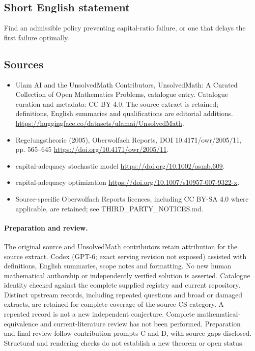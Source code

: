 \documentclass[11pt]{article}
\begin{document}
\subsection{Short English statement}
Find an admissible policy preventing capital-ratio failure, or one that delays the first failure optimally.
\subsection{Sources}
\begin{itemize}
\item[\hypertarget{source:statement:1}{S1}] Ulam AI and the UnsolvedMath Contributors, UnsolvedMath: A Curated Collection of Open Mathematics Problems, catalogue entry. Catalogue curation and metadata: CC BY 4.0. The source extract is retained; definitions, English summaries and qualifications are editorial additions.
\url{https://huggingface.co/datasets/ulamai/UnsolvedMath}.
\item[\hypertarget{source:statement:2}{S2}] Regelungstheorie (2005), Oberwolfach Reports, DOI 10.4171/owr/2005/11, pp. 565--645
\url{https://doi.org/10.4171/owr/2005/11}.
\item[\hypertarget{source:statement:3}{S3}] capital-adequacy stochastic model
\url{https://doi.org/10.1002/asmb.609}.
\item[\hypertarget{source:statement:4}{S4}] capital-adequacy optimization
\url{https://doi.org/10.1007/s10957-007-9322-x}.
\item Source-specific Oberwolfach Reports licences, including CC BY-SA 4.0 where applicable, are retained; see THIRD\_PARTY\_NOTICES.md.
\end{itemize}
\paragraph{Preparation and review.}
The original source and UnsolvedMath contributors retain attribution for the source extract. Codex (GPT-6; exact serving revision not exposed) assisted with definitions, English summaries, scope notes and formatting. No new human mathematical authorship or independently verified solution is asserted. Catalogue identity checked against the complete supplied registry and current repository. Distinct upstream records, including repeated questions and broad or damaged extracts, are retained for complete coverage of the source CS category. A repeated record is not a new independent conjecture. Complete mathematical-equivalence and current-literature review has not been performed. Preparation and final review follow contribution prompts C and D, with source gaps disclosed. Structural and rendering checks do not establish a new theorem or open status.
\label{end:statement}
\end{document}
